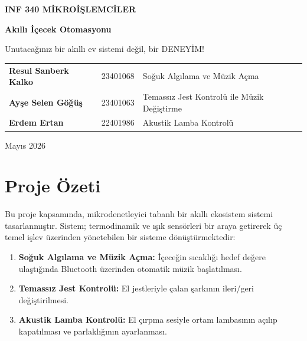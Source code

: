 \documentclass[12pt, a4paper]{article}
\begin{document}
\begin{titlepage}
  \centering
  \vspace*{1.5cm}
  {\Large \textbf{INF 340 MİKROİŞLEMCİLER}\par}
  \vspace{1.5cm}
  {\LARGE \textbf{Akıllı İçecek Otomasyonu}\par}
    \vspace{0.5cm}
  {\large Unutacağınız bir akıllı ev sistemi değil, bir DENEYİM!\par}
  \vspace{2cm}
  \begin{tabular}{ll}
    \textbf{Resul Sanberk Kalko}  & 23401068 & Soğuk Algılama ve Müzik Açma\\[4pt]
    \textbf{Ayşe Selen Göğüş} & 23401063 & Temassız Jest Kontrolü ile Müzik Değiştirme\\[4pt]
    \textbf{Erdem Ertan}         & 22401986 & Akustik Lamba Kontrolü\\
  \end{tabular}
  \vfill
  {\large Mayıs 2026\par}
\end{titlepage}

\tableofcontents
\newpage

\section{Proje Özeti}

Bu proje kapsamında, mikrodenetleyici tabanlı bir akıllı ekosistem sistemi
tasarlanmıştır. Sistem; termodinamik ve ışık sensörleri bir araya
getirerek üç temel işlev üzerinden yönetebilen bir
sisteme dönüştürmektedir:

\begin{enumerate}[leftmargin=*, label=\arabic*.]
  \item \textbf{Soğuk Algılama ve Müzik Açma:} İçeceğin sıcaklığı hedef değere
        ulaştığında Bluetooth üzerinden otomatik müzik başlatılması.
  \item \textbf{Temassız Jest Kontrolü:} El jestleriyle çalan şarkının
        ileri/geri değiştirilmesi.
  \item \textbf{Akustik Lamba Kontrolü:} El çırpma sesiyle ortam lambasının açılıp
        kapatılması ve parlaklığının ayarlanması.
\end{enumerate}
\end{document}
